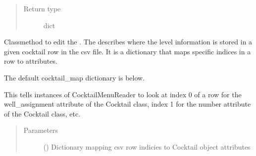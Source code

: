 \documentclass[letterpaper,10pt,english]{sphinxmanual}
\begin{document}
\begin{fulllineitems}
\begin{fulllineitems}
\begin{quote}
\begin{description}
\item[{Return type}] \leavevmode
dict

\end{description}\end{quote}

\end{fulllineitems}


\begin{fulllineitems}
\label{\detokenize{polo.utils:polo.utils.io_utils.CocktailMenuReader.set_cocktail_map}}
Classmethod to edit the
{\hyperref[\detokenize{polo.utils:polo.utils.io_utils.CocktailMenuReader.cocktail_map}]{}}.
The {\hyperref[\detokenize{polo.utils:polo.utils.io_utils.CocktailMenuReader.cocktail_map}]{}}
describes where the  level information 
is stored in a given cocktail row in the csv file. 
It is a dictionary that maps specific indices in a row to
 attributes.

The default cocktail\_map dictionary is below.

\begin{sphinxVerbatim}[commandchars=\\\{\}]
  
\end{sphinxVerbatim}

This tells instances of CocktailMenuReader to look at index 0 of a row
for the well\_assignment attribute of the Cocktail class, index 1 for
the number attribute of the Cocktail class, etc.
\begin{quote}\begin{description}
\item[{Parameters}] \leavevmode
{} () \textendash{} Dictionary mapping csv row indicies to Cocktail object
attributes


\end{description}
\end{quote}
\end{fulllineitems}
\end{fulllineitems}
\end{document}
